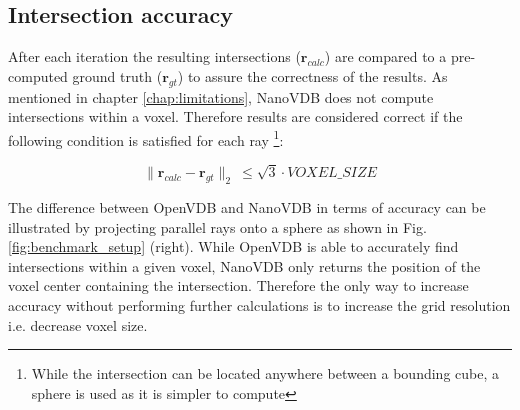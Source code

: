 \subsection{Intersection accuracy}

After each iteration the resulting intersections ($\mathbf{r}_{calc}$) are compared to a pre-computed ground truth ($\mathbf{r}_{gt}$) to assure the correctness of the results.
As mentioned in chapter \ref{chap:limitations}, NanoVDB does not compute intersections within a voxel.
Therefore results are considered correct if the following condition is satisfied for each ray
\footnote{While the intersection can be located anywhere between a bounding cube, a sphere is used as it is simpler to compute}:

\begin{equation}
	\lVert \mathbf{r}_{calc} - \mathbf{r}_{gt} \lVert _2 \:  \leq \sqrt{3} \cdot VOXEL\_SIZE
\end{equation}


The difference between OpenVDB and NanoVDB in terms of accuracy can be illustrated by projecting parallel rays onto a sphere as shown in Fig. \ref{fig:benchmark_setup} (right).
While OpenVDB is able to accurately find intersections within a given voxel, NanoVDB only returns the position of the voxel center containing the intersection.
Therefore the only way to increase accuracy without performing further calculations is to increase the grid resolution i.e. decrease voxel size.

